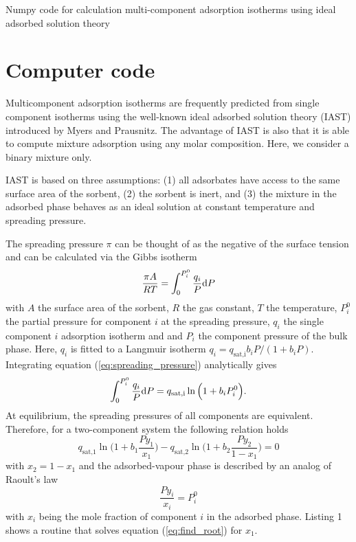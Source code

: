\documentclass{article}
\begin{document}
\begin{center}
{\Large Numpy code for calculation multi-component adsorption isotherms using ideal adsorbed solution theory}
\end{center}
\section{Computer code}

Multicomponent adsorption isotherms are frequently predicted from single component isotherms using the well-known ideal adsorbed solution theory (IAST) introduced by Myers and Prausnitz.\cite{Myers1965} The advantage of IAST is also that it is able to compute mixture adsorption using any molar composition. Here, we consider a binary mixture only.

IAST is based on three assumptions: (1) all adsorbates have access to the same surface area of the sorbent, (2) the sorbent is inert, and (3) the mixture in the adsorbed phase behaves as an ideal solution at constant temperature and spreading pressure.

The spreading pressure $\pi$ can be thought of as the negative of the surface tension and can be calculated via the Gibbs isotherm\cite{Myers1965}
%
\begin{equation}
        \frac{{\pi}A}{RT} = \int_0^{P_i^0}\frac{q_i}{P} {\dif P}
	\label{eq:spreading_pressure}
\end{equation}
%
with $A$ the surface area of the sorbent, $R$ the gas constant, $T$ the temperature, $P_i^0$ the partial pressure for component $i$ at the spreading pressure, $q_i$ the single component $i$ adsorption isotherm and and $P_i$ the component pressure of the bulk phase. Here, $q_i$ is fitted to a Langmuir isotherm $q_i = q_\text{sat,i}b_iP/(1+b_iP)$. Integrating equation (\ref{eq:spreading_pressure}) analytically gives
%
\begin{equation}
	\int_0^{P_i^0}\frac{q_i}{P} {\dif P} =  q_\text{sat,i}\ln\Big({1+b_iP_i^0}\Big). 
\end{equation}
%
At equilibrium, the spreading pressures of all components are equivalent. Therefore, for a two-component system the following relation holds 
%
\begin{equation} 
	q_\text{sat,1}\ln{\Big(1+b_1\frac{Py_1}{x_1}\Big)} - q_\text{sat,2}\ln{\Big(1+b_2\frac{Py_2}{1-x_1}\Big)} = 0
	\label{eq:find_root}
\end{equation} 
%
with $x_2 = 1 - x_1$ and the adsorbed-vapour phase is described by an analog of Raoult's law 
%
\begin{equation}
        \frac{Py_i}{x_i} = P_i^0
\end{equation}
%
with $x_i$ being the mole fraction of component $i$ in the adsorbed phase. Listing 1 shows a routine that solves  equation (\ref{eq:find_root}) for $x_1$.
\end{document}
